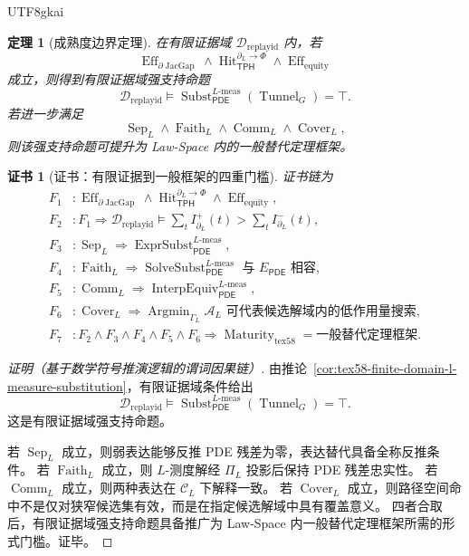 \documentclass[12pt]{article}
\newtheorem{theorem}{定理}[section]
\newtheorem{Certificate}{证书}[section]
\newcommand{\TPH}{\ensuremath{\mathsf{TPH}}}
\newcommand{\PDE}{\ensuremath{\mathsf{PDE}}}
\DeclareMathOperator{\Eff}{Eff}
\DeclareMathOperator{\Hit}{Hit}
\DeclareMathOperator{\JacGap}{JacGap}
\DeclareMathOperator{\Tunnel}{Tunnel}
\DeclareMathOperator{\Subst}{Subst}
\DeclareMathOperator{\ExprSubst}{ExprSubst}
\DeclareMathOperator{\SolveSubst}{SolveSubst}
\DeclareMathOperator{\InterpEquiv}{InterpEquiv}
\DeclareMathOperator{\Sep}{Sep}
\DeclareMathOperator{\Faith}{Faith}
\DeclareMathOperator{\Cover}{Cover}
\DeclareMathOperator{\Comm}{Comm}
\DeclareMathOperator{\Maturity}{Maturity}
\newcommand{\Lmeas}{L\text{-}\mathrm{meas}}
\DeclareMathOperator*{\Argmin}{Argmin}
\begin{document}
\begin{CJK*}{UTF8}{gkai}
\begin{theorem}[成熟度边界定理]
\label{thm:tex58-maturity-boundary}
在有限证据域 \(\mathcal D_{\mathrm{replayid}}\) 内，若
\[
  \Eff_{\partial\JacGap}
  \wedge
  \Hit_{\TPH}^{\partial_L\to\Phi}
  \wedge
  \Eff_{\mathrm{equity}}
\]
成立，则得到有限证据域强支持命题
\[
  \mathcal D_{\mathrm{replayid}}
  \models
  \Subst_{\PDE}^{\Lmeas}(\Tunnel_G)=\top.
\]
若进一步满足
\[
  \Sep_L\wedge\Faith_L\wedge\Comm_L\wedge\Cover_L,
\]
则该强支持命题可提升为 Law-Space 内的一般替代定理框架。
\end{theorem}

\begin{Certificate}[证书：有限证据到一般框架的四重门槛]
\label{cert:tex58-maturity-boundary}
证书链为
\[
\begin{aligned}
  F_1 &: \Eff_{\partial\JacGap}\wedge
  \Hit_{\TPH}^{\partial_L\to\Phi}\wedge
  \Eff_{\mathrm{equity}},\\
  F_2 &: F_1\Rightarrow
  \mathcal D_{\mathrm{replayid}}
  \models
  \sum_tI^+_{\partial_L}(t)>\sum_tI^-_{\partial_L}(t),\\
  F_3 &: \Sep_L
  \Rightarrow
  \ExprSubst_{\PDE}^{\Lmeas},\\
  F_4 &: \Faith_L
  \Rightarrow
  \SolveSubst_{\PDE}^{\Lmeas}\text{ 与 }E_{\PDE}\text{ 相容},\\
  F_5 &: \Comm_L
  \Rightarrow
  \InterpEquiv_{\PDE}^{\Lmeas},\\
  F_6 &: \Cover_L
  \Rightarrow
  \Argmin_{\Gamma_L}\mathcal A_L\text{ 可代表候选解域内的低作用量搜索},\\
  F_7 &: F_2\wedge F_3\wedge F_4\wedge F_5\wedge F_6
  \Rightarrow
  \Maturity_{\mathrm{tex58}}=\text{一般替代定理框架}.
\end{aligned}
\]
\end{Certificate}

\begin{proof}[证明（基于数学符号推演逻辑的谓词因果链）]
由推论~\ref{cor:tex58-finite-domain-l-measure-substitution}，有限证据域条件给出
\[
  \mathcal D_{\mathrm{replayid}}
  \models
  \Subst_{\PDE}^{\Lmeas}(\Tunnel_G)=\top.
\]
这是有限证据域强支持命题。

若 \(\Sep_L\) 成立，则弱表达能够反推 PDE 残差为零，表达替代具备全称反推条件。
若 \(\Faith_L\) 成立，则 \(L\)-测度解经 \(\Pi_L\) 投影后保持 PDE 残差忠实性。
若 \(\Comm_L\) 成立，则两种表达在 \(\mathcal C_L\) 下解释一致。
若 \(\Cover_L\) 成立，则路径空间命中不是仅对狭窄候选集有效，而是在指定候选解域中具有覆盖意义。
四者合取后，有限证据域强支持命题具备推广为 Law-Space 内一般替代定理框架所需的形式门槛。证毕。
\end{proof}


\end{CJK*}
\end{document}
